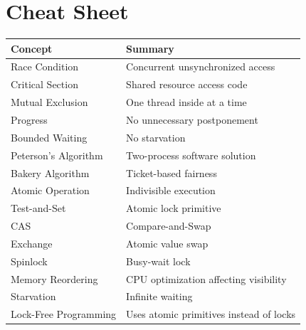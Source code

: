 \section{Cheat Sheet}

\begin{longtable}{|p{5cm}|p{8cm}|}
\hline
Concept & Summary \\
\hline
Race Condition & Concurrent unsynchronized access \\
\hline
Critical Section & Shared resource access code \\
\hline
Mutual Exclusion & One thread inside at a time \\
\hline
Progress & No unnecessary postponement \\
\hline
Bounded Waiting & No starvation \\
\hline
Peterson's Algorithm & Two-process software solution \\
\hline
Bakery Algorithm & Ticket-based fairness \\
\hline
Atomic Operation & Indivisible execution \\
\hline
Test-and-Set & Atomic lock primitive \\
\hline
CAS & Compare-and-Swap \\
\hline
Exchange & Atomic value swap \\
\hline
Spinlock & Busy-wait lock \\
\hline
Memory Reordering & CPU optimization affecting visibility \\
\hline
Starvation & Infinite waiting \\
\hline
Lock-Free Programming & Uses atomic primitives instead of locks \\
\hline
\end{longtable}